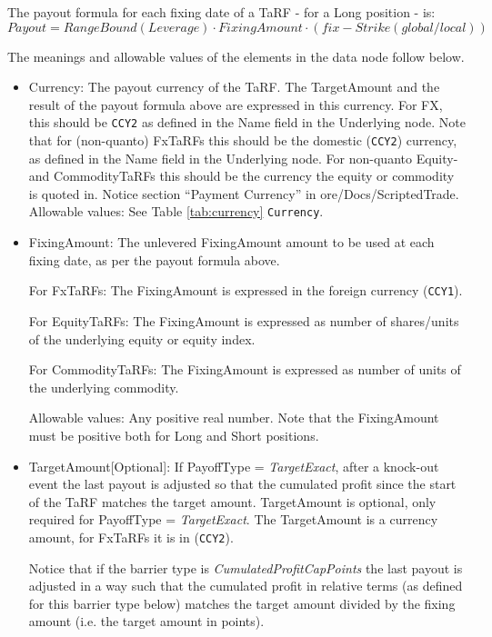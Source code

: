 The payout formula for each fixing date of a TaRF - for a Long position - is:
$
Payout = RangeBound(Leverage) \cdot FixingAmount \cdot (fix - Strike(global/local))
$


The meanings and allowable values of the elements in the data  node follow below.

\begin{itemize}
    \item Currency: The payout currency of the TaRF. The TargetAmount and the result of the payout formula above are
expressed in this currency.  For FX, this should be \lstinline!CCY2! as defined in the Name field in the Underlying node.
Note that for (non-quanto) FxTaRFs this should be the domestic (\lstinline!CCY2!) currency, as defined in the Name field in
the Underlying node. For non-quanto Equity- and CommodityTaRFs this should be the currency the equity or commodity is quoted in.
Notice section ``Payment Currency'' in ore/Docs/ScriptedTrade. \\
      Allowable values: See Table \ref{tab:currency} \lstinline!Currency!.

    \item FixingAmount: The unlevered FixingAmount amount to be used at each fixing date, as per the payout formula above.  
    
    For FxTaRFs: The FixingAmount is expressed in the foreign currency (\lstinline!CCY1!).
    
   For EquityTaRFs: The FixingAmount is expressed as number of shares/units of the underlying equity or equity index.
    
   For CommodityTaRFs: The FixingAmount is expressed as number of units of the underlying commodity.
    
      Allowable values: Any positive real number. Note that the FixingAmount must
be positive both for Long and Short positions.

    \item TargetAmount[Optional]: If PayoffType = \emph{TargetExact}, after a knock-out event the last payout is
      adjusted so that the cumulated profit since the start of the TaRF matches the target amount.  TargetAmount is
      optional, only required for PayoffType = \emph{TargetExact}. The TargetAmount is a currency amount, for FxTaRFs it
      is in (\lstinline!CCY2!).

      Notice that if the barrier type is \emph{CumulatedProfitCapPoints} the last payout is adjusted in a way such that
      the cumulated profit in relative terms (as defined for this barrier type below) matches the target amount divided
      by the fixing amount (i.e. the target amount in points). \\


\end{itemize}
